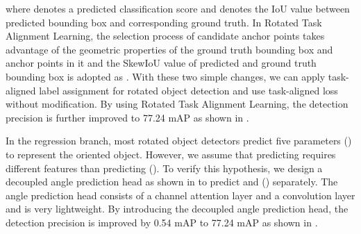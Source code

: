 \documentclass[final]{cvpr}
\begin{document}
where  denotes a predicted classification score and  denotes the IoU value between predicted bounding box and corresponding ground truth. In Rotated Task Alignment Learning, the selection process of candidate anchor points takes advantage of the geometric properties of the ground truth bounding box and anchor points in it and the SkewIoU value of predicted and ground truth bounding box is adopted as . With these two simple changes, we can apply task-aligned label assignment for rotated object detection and use task-aligned loss without modification. By using Rotated Task Alignment Learning, the detection precision is further improved to 77.24 mAP as shown in . 

 In the regression branch, most rotated object detectors predict five parameters () to represent the oriented object. However, we assume that predicting  requires different features than predicting (). To verify this hypothesis, we design a decoupled angle prediction head as shown in  to predict  and () separately. The angle prediction head consists of a channel attention layer and a convolution layer and is very lightweight. By introducing the decoupled angle prediction head, the detection precision is improved by 0.54 mAP to 77.24 mAP as shown in .
\end{document}
